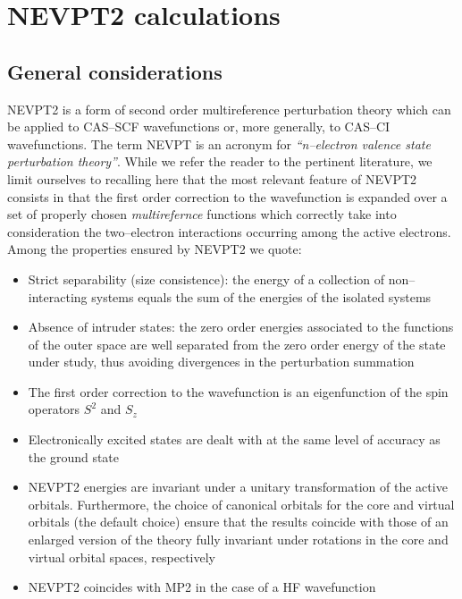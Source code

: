 \chapter{NEVPT2 calculations}\label{ch:nevpt2}

\section{General considerations}\label{sec:nevptgeneral}
NEVPT2  is a form of second order multireference
perturbation theory 
which can be applied to CAS--SCF wavefunctions or, more generally, to
CAS--CI wavefunctions. The term NEVPT is an acronym for
\textit{``n--electron valence state perturbation theory''}. While we
refer the reader to the pertinent
literature\cite{nevpt1,nevpt2,nevpt3,nevpt4}, we limit ourselves to
recalling here that the most relevant feature of NEVPT2 consists in
that the first order correction to the wavefunction is expanded over a
set of properly chosen \emph{multirefernce} functions which correctly
take into consideration the two--electron interactions occurring among
the active electrons. Among the properties ensured by NEVPT2 we quote:

\begin{itemize}
\item Strict separability (size consistence): the energy of a
  collection of non--interacting systems equals the sum of the
  energies of the isolated systems
\item Absence of intruder states: the zero order energies associated
  to the functions of the outer space are well separated from the zero
  order energy of the state under study, thus avoiding divergences in
  the perturbation summation
\item The first order correction to the wavefunction is an
  eigenfunction of the spin operators $S^2$ and $S_z$
\item Electronically excited states are dealt with at the same level
  of accuracy as the ground state
\item NEVPT2 energies are invariant under a unitary transformation of
  the active orbitals. Furthermore, the choice of canonical orbitals
  for the core and virtual orbitals (the default choice) ensure that
  the results coincide with those of an enlarged version of the theory
  fully invariant under rotations in the core and virtual orbital
  spaces, respectively\cite{nevpt4}
\item NEVPT2 coincides with MP2 in the case of a HF wavefunction
\end{itemize}

